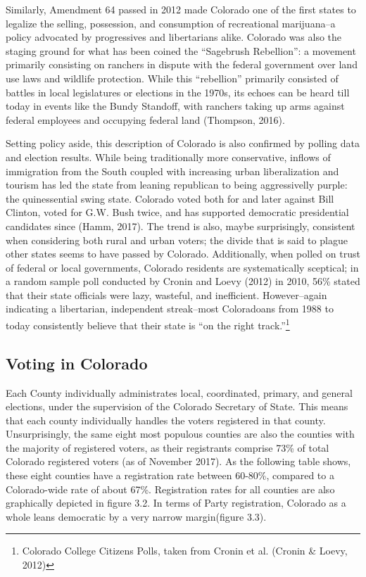 \documentclass[12pt,twoside]{reedthesis}
\begin{document}
  Similarly, Amendment 64 passed in 2012 made Colorado one of the first
  states to legalize the selling, possession, and consumption of
  recreational marijuana--a policy advocated by progressives and
  libertarians alike. Colorado was also the staging ground for what has
  been coined the ``Sagebrush Rebellion'': a movement primarily consisting
  on ranchers in dispute with the federal government over land use laws
  and wildlife protection. While this ``rebellion'' primarily consisted of
  battles in local legislatures or elections in the 1970s, its echoes can
  be heard till today in events like the Bundy Standoff, with ranchers
  taking up arms against federal employees and occupying federal land
  (Thompson, 2016).
  
  Setting policy aside, this description of Colorado is also confirmed by
  polling data and election results. While being traditionally more
  conservative, inflows of immigration from the South coupled with
  increasing urban liberalization and tourism has led the state from
  leaning republican to being aggressivelly purple: the quinessential
  swing state. Colorado voted both for and later against Bill Clinton,
  voted for G.W. Bush twice, and has supported democratic presidential
  candidates since (Hamm, 2017). The trend is also, maybe surprisingly,
  consistent when considering both rural and urban voters; the divide that
  is said to plague other states seems to have passed by Colorado.
  Additionally, when polled on trust of federal or local governments,
  Colorado residents are systematically sceptical; in a random sample poll
  conducted by Cronin and Loevy (2012) in 2010, 56\% stated that their
  state officials were lazy, wasteful, and inefficient. However--again
  indicating a libertarian, independent streak--most Coloradoans from 1988
  to today consistently believe that their state is ``on the right
  track.''\footnote{Colorado College Citizens Polls, taken from Cronin et
    al. (Cronin \& Loevy, 2012)}
  
  \subsection{Voting in Colorado}\label{voting-in-colorado}
  
  Each County individually administrates local, coordinated, primary, and
  general elections, under the supervision of the Colorado Secretary of
  State. This means that each county individually handles the voters
  registered in that county. Unsurprisingly, the same eight most populous
  counties are also the counties with the majority of registered voters,
  as their registrants comprise 73\% of total Colorado registered voters
  (as of November 2017). As the following table shows, these eight
  counties have a registration rate between 60-80\%, compared to a
  Colorado-wide rate of about 67\%. Registration rates for all counties
  are also graphically depicted in figure 3.2. In terms of Party
  registration, Colorado as a whole leans democratic by a very narrow
  margin(figure 3.3).
  
\end{document}
